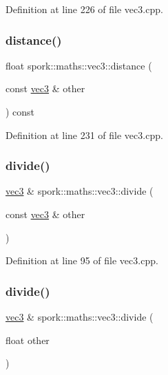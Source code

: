 Definition at line 226 of file vec3.\+cpp.

\mbox{\label{structspork_1_1maths_1_1vec3_a9196265ff8b731368caaea9b0ae87147}} 
\subsubsection{\texorpdfstring{distance()}{distance()}}
{\footnotesize\ttfamily float spork\+::maths\+::vec3\+::distance (\begin{DoxyParamCaption}\item[{const \hyperlink{structspork_1_1maths_1_1vec3}{vec3} \&}]{other }\end{DoxyParamCaption}) const}



Definition at line 231 of file vec3.\+cpp.

\mbox{\label{structspork_1_1maths_1_1vec3_a401010d532b9cc509ba8808f2b5bdd21}} 
\subsubsection{\texorpdfstring{divide()}{divide()}\hspace{0.1cm}{\footnotesize\ttfamily [1/2]}}
{\footnotesize\ttfamily \hyperlink{structspork_1_1maths_1_1vec3}{vec3} \& spork\+::maths\+::vec3\+::divide (\begin{DoxyParamCaption}\item[{const \hyperlink{structspork_1_1maths_1_1vec3}{vec3} \&}]{other }\end{DoxyParamCaption})}



Definition at line 95 of file vec3.\+cpp.

\mbox{\label{structspork_1_1maths_1_1vec3_a951e89900a7a9034c65fb84ea6dfc9ae}} 
\subsubsection{\texorpdfstring{divide()}{divide()}\hspace{0.1cm}{\footnotesize\ttfamily [2/2]}}
{\footnotesize\ttfamily \hyperlink{structspork_1_1maths_1_1vec3}{vec3} \& spork\+::maths\+::vec3\+::divide (\begin{DoxyParamCaption}\item[{float}]{other }\end{DoxyParamCaption})}



